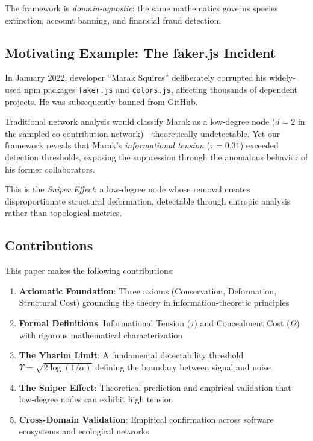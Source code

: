 \documentclass[11pt,a4paper]{article}
\theoremstyle{definition}
\theoremstyle{remark}
\newcommand{\Yharim}{\Upsilon}
\begin{document}
The framework is \emph{domain-agnostic}: the same mathematics governs species extinction, account banning, and financial fraud detection.

\subsection{Motivating Example: The faker.js Incident}

In January 2022, developer ``Marak Squires'' deliberately corrupted his widely-used npm packages \texttt{faker.js} and \texttt{colors.js}, affecting thousands of dependent projects. He was subsequently banned from GitHub. 

Traditional network analysis would classify Marak as a low-degree node ($d=2$ in the sampled co-contribution network)---theoretically undetectable. Yet our framework reveals that Marak's \emph{informational tension} ($\tau = 0.31$) exceeded detection thresholds, exposing the suppression through the anomalous behavior of his former collaborators.

This is the \emph{Sniper Effect}: a low-degree node whose removal creates disproportionate structural deformation, detectable through entropic analysis rather than topological metrics.

\subsection{Contributions}

This paper makes the following contributions:

\begin{enumerate}
    \item \textbf{Axiomatic Foundation}: Three axioms (Conservation, Deformation, Structural Cost) grounding the theory in information-theoretic principles
    
    \item \textbf{Formal Definitions}: Informational Tension ($\tau$) and Concealment Cost ($\Omega$) with rigorous mathematical characterization
    
    \item \textbf{The Yharim Limit}: A fundamental detectability threshold $\Yharim = \sqrt{2\log(1/\alpha)}$ defining the boundary between signal and noise
    
    \item \textbf{The Sniper Effect}: Theoretical prediction and empirical validation that low-degree nodes can exhibit high tension
    
    \item \textbf{Cross-Domain Validation}: Empirical confirmation across software ecosystems and ecological networks
\end{enumerate}
\end{document}
